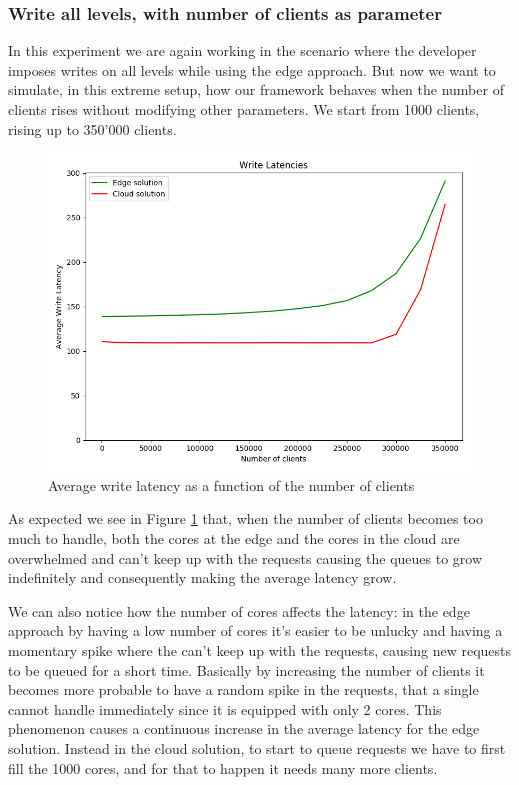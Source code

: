 \subsubsection{Write all levels, with number of clients as parameter}
In this experiment we are again working in the scenario where the developer imposes writes on all levels while using the edge approach. But now we want to simulate, in this extreme setup, how our framework behaves when the number of clients rises without modifying other parameters.
We start from 1000 clients, rising up to 350'000 clients.

\begin{figure}[H]
    \centering
    \includegraphics[width=0.86\linewidth]{Figures/Evaluation/write-all-clients-latency.png}
    \caption{Average write latency as a function of the number of clients}
    \label{fig:/write-all-clients-latency}
\end{figure}

As expected we see in Figure \ref{fig:/write-all-clients-latency} that, when the number of clients becomes too much to handle, both the cores at the edge and the cores in the cloud are overwhelmed and can't keep up with the requests causing the queues to grow indefinitely and consequently making the average latency grow.

We can also notice how the number of cores affects the latency: in the edge approach by having a low number of cores it's easier to be unlucky and having a momentary spike where the  can't keep up with the requests, causing new requests to be queued for a short time. Basically by increasing the number of clients it becomes more probable to have a random spike in the requests, that a single  cannot handle immediately since it is equipped with only 2 cores. This phenomenon causes a continuous increase in the average latency for the edge solution.
Instead in the cloud solution, to start to queue requests we have to first fill the 1000 cores, and for that to happen it needs many more clients.

